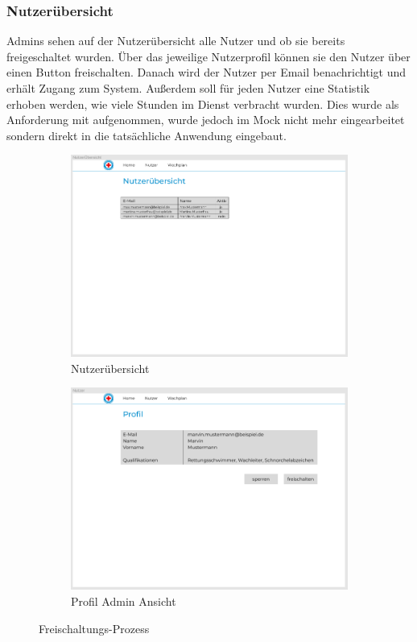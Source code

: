 \documentclass[fontsize=12pt,openright,oneside,paper=a4,BCOR=1cm]{scrbook}
\begin{document}
\subsubsection{Nutzerübersicht}

Admins sehen auf der Nutzerübersicht alle Nutzer und ob sie bereits freigeschaltet wurden. Über das jeweilige Nutzerprofil können sie den Nutzer über einen Button freischalten. Danach wird der Nutzer per Email benachrichtigt und erhält Zugang zum System. Außerdem soll für jeden Nutzer eine Statistik erhoben werden, wie viele Stunden im Dienst verbracht wurden. Dies wurde als Anforderung mit aufgenommen, wurde jedoch im Mock nicht mehr eingearbeitet sondern direkt in die tatsächliche Anwendung eingebaut.\\

\begin{figure}[H]
  \centering
  \begin{subfigure}[b]{0.4\linewidth}
    \includegraphics[width=\linewidth]{Anlagen/Figma/6-Nutzeruebersicht.png}
    \caption{Nutzerübersicht}
  \end{subfigure}
  \begin{subfigure}[b]{0.4\linewidth}
    \includegraphics[width=\linewidth]{Anlagen/Figma/7-ProfilAdminSicht.png}
    \caption{Profil Admin Ansicht}
  \end{subfigure}
  \caption{Freischaltungs-Prozess}
  \label{fig:freischaltprozess}
\end{figure}
\end{document}
